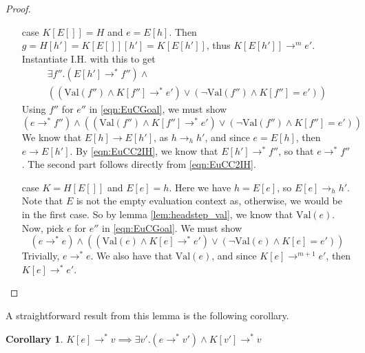 \documentclass[a4paper, 11pt]{report}
\newtheorem{corollary}{Corollary}[theorem]
\theoremstyle{definition}
\newcommand{\expr}{e}
\newcommand{\val}{v}
\newcommand{\elctx}{K}
\newcommand{\step}{\rightarrow}
\newcommand{\stepS}{\rightarrow^*}
\newcommand{\hstep}{\rightarrow_h}
\newcommand{\Val}[1]{\mathrm{Val}(#1)}
\begin{document}
\begin{proof}
\begin{itemize}
\begin{itemize}
      \item[case] $\elctx[E[]] = H$ and $\expr = E[h]$. 
        Then $g = H[h'] = \elctx[E[]][h'] = \elctx[E[h']]$, thus $\elctx[E[h']] \step^m \expr'$. Instantiate I.H. with this to get
        \begin{multline}\label{eqn:EuCC2IH}
          \exists f'' . (E[h'] \stepS f'') \land\\
          \left((\Val{f''} \land \elctx[f''] \stepS \expr') \lor
          (\neg \Val{f''} \land \elctx[f''] = \expr') \right)
        \end{multline}
        Using $f''$ for $\expr''$ in \ref{eqn:EuCGoal}, we must show
        \begin{equation*}
          (\expr \stepS f'') \land 
          \left( (\Val{f''} \land \elctx[f''] \stepS \expr') \lor
          (\neg \Val{f''} \land \elctx[f''] = \expr') \right)
        \end{equation*}
        We know that $E[h] \step E[h']$, as $h \hstep h'$, and since $\expr = E[h]$, then $\expr \step E[h']$. By 
        \ref{eqn:EuCC2IH}, we know that $E[h'] \stepS f''$, so that $\expr \stepS f''$. The second part follows directly from \ref{eqn:EuCC2IH}.

      \item[case] $\elctx = H[E[]]$ and $E[\expr] = h$.
        Here we have $h = E[\expr]$, so $E[\expr] \hstep h'$. Note that $E$ is not the empty evaluation context as, otherwise, we would be in the first case. So by lemma \ref{lem:headstep_val}, we know that $\Val{\expr}$. Now, pick $\expr$ for $\expr''$ in \ref{eqn:EuCGoal}. We must show 
        \begin{equation*}
          (\expr \stepS \expr) \land 
          \left( (\Val{\expr} \land \elctx[\expr] \stepS \expr') \lor
          (\neg \Val{\expr} \land \elctx[\expr] = \expr') \right)
        \end{equation*}
        Trivially, $\expr \stepS \expr$. We also have that $\Val{\expr}$, and since $\elctx[\expr] \step^{m + 1} \expr'$, then $\elctx[\expr] \stepS \expr'$.
    \end{itemize}
  \end{itemize}
\end{proof}
A straightforward result from this lemma is the following corollary.
\begin{corollary}\label{cor:EuC_val}
  $\elctx[\expr] \stepS \val \implies \exists \val'. (\expr \stepS \val') \land \elctx[\val'] \stepS \val$
\end{corollary}
\end{document}
